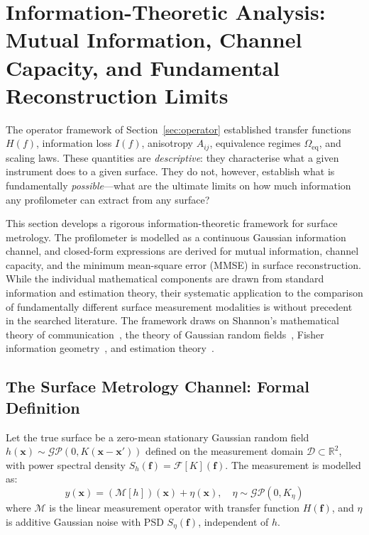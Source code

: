 \documentclass[review,12pt]{elsarticle}
\begin{document}
\section{Information-Theoretic Analysis: Mutual Information, Channel Capacity, and Fundamental Reconstruction Limits}
\label{sec:info_theory}

The operator framework of Section~\ref{sec:operator} established transfer functions $H(f)$, information loss $ I(f)$, anisotropy $ A_{ij}$, equivalence regimes $\Omega_\mathrm{eq}$, and scaling laws. These quantities are \emph{descriptive}: they characterise what a given instrument does to a given surface. They do not, however, establish what is fundamentally \emph{possible}---what are the ultimate limits on how much information any profilometer can extract from any surface?

This section develops a rigorous information-theoretic framework for surface metrology. The profilometer is modelled as a continuous Gaussian information channel, and closed-form expressions are derived for mutual information, channel capacity, and the minimum mean-square error (MMSE) in surface reconstruction. While the individual mathematical components are drawn from standard information and estimation theory, their systematic application to the comparison of fundamentally different surface measurement modalities is without precedent in the searched literature. The framework draws on Shannon's mathematical theory of communication~\cite{shannon1948mathematical}, the theory of Gaussian random fields~\cite{adler2007random}, Fisher information geometry~\cite{amari2000methods}, and estimation theory~\cite{cover2006elements}.

\subsection{The Surface Metrology Channel: Formal Definition}

Let the true surface be a zero-mean stationary Gaussian random field $h(\mathbf{x}) \sim \mathcal{GP}(0, K(\mathbf{x}-\mathbf{x}'))$ defined on the measurement domain $\mathcal{D} \subset \mathbb{R}^2$, with power spectral density $S_h(\mathbf{f}) = \mathcal{F}[K](\mathbf{f})$. The measurement is modelled as:
\begin{equation}
    y(\mathbf{x}) = (\mathcal{M}[h])(\mathbf{x}) + \eta(\mathbf{x}), \quad \eta \sim \mathcal{GP}(0, K_\eta)
    \label{eq:channel_model}
\end{equation}
where $\mathcal{M}$ is the linear measurement operator with transfer function $ H(\mathbf{f})$, and $\eta$ is additive Gaussian noise with PSD $ S_\eta(\mathbf{f})$, independent of $h$.
\end{document}
